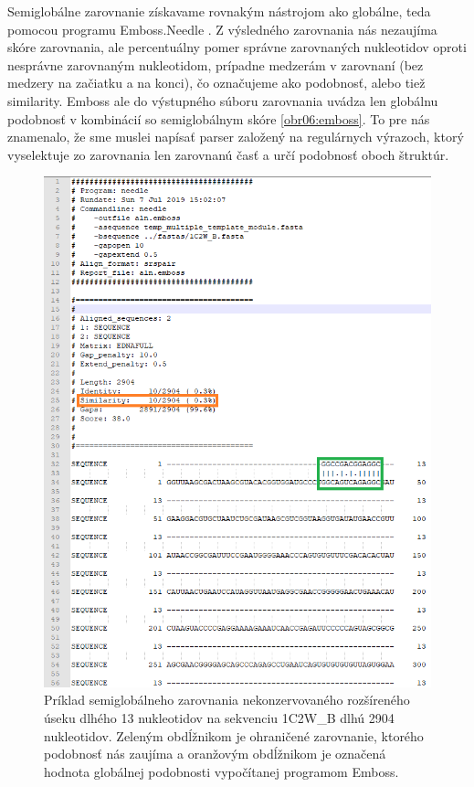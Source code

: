 \indent Semiglobálne zarovnanie získavame rovnakým nástrojom ako globálne, teda pomocou programu Emboss.Needle \cite{Emboss}. Z výsledného zarovnania nás nezaujíma skóre zarovnania, ale percentuálny pomer správne zarovnaných nukleotidov oproti nesprávne zarovnaným nukleotidom, prípadne medzerám v  zarovnaní (bez medzery na začiatku a na konci), čo označujeme ako podobnosť, alebo tiež similarity. Emboss ale do výstupného súboru zarovnania uvádza len globálnu podobnosť v kombinácií so semiglobálnym skóre \autoref{obr06:emboss}. To pre nás znamenalo, že sme muslei napísať parser založený na regulárnych výrazoch, ktorý vyselektuje zo zarovnania len zarovnanú časť a určí podobnosť oboch štruktúr.
\begin{figure}%
\includegraphics[width=\textwidth]{../img/emboss}
\caption{Príklad semiglobálneho zarovnania nekonzervovaného rozšíreného úseku dlhého 13 nukleotidov na sekvenciu 1C2W\_B dlhú 2904 nukleotidov. Zeleným obdĺžnikom je ohraničené zarovnanie, ktorého podobnosť nás zaujíma a oranžovým obdĺžnikom je označená hodnota globálnej podobnosti vypočítanej programom Emboss.}
\label{obr06:emboss}
\end{figure}


